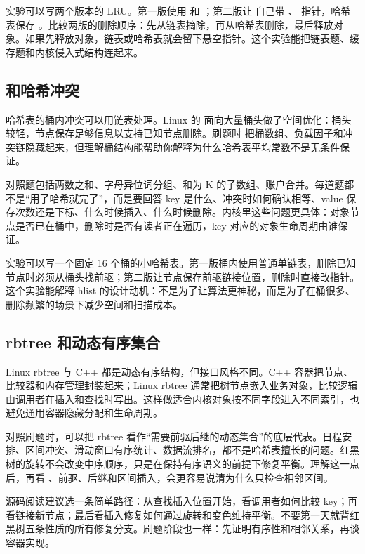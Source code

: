 实验可以写两个版本的 LRU。第一版使用  和 ；第二版让  自己带 、 指针，哈希表保存 。比较两版的删除顺序：先从链表摘除，再从哈希表删除，最后释放对象。如果先释放对象，链表或哈希表就会留下悬空指针。这个实验能把链表题、缓存题和内核侵入式结构连起来。

\subsection{ 和哈希冲突}

哈希表的桶内冲突可以用链表处理。Linux 的  面向大量桶头做了空间优化：桶头较轻，节点保存足够信息以支持已知节点删除。刷题时  把桶数组、负载因子和冲突链隐藏起来，但理解桶结构能帮助你解释为什么哈希表平均常数不是无条件保证。

对照题包括两数之和、字母异位词分组、和为 K 的子数组、账户合并。每道题都不是“用了哈希就完了”，而是要回答 key 是什么、冲突时如何确认相等、value 保存次数还是下标、什么时候插入、什么时候删除。内核里这些问题更具体：对象节点是否已在桶中，删除时是否有读者正在遍历，key 对应的对象生命周期由谁保证。

实验可以写一个固定 16 个桶的小哈希表。第一版桶内使用普通单链表，删除已知节点时必须从桶头找前驱；第二版让节点保存前驱链接位置，删除时直接改指针。这个实验能解释 hlist 的设计动机：不是为了让算法更神秘，而是为了在桶很多、删除频繁的场景下减少空间和扫描成本。

\subsection{rbtree 和动态有序集合}

Linux rbtree 与 C++  都是动态有序结构，但接口风格不同。C++ 容器把节点、比较器和内存管理封装起来；Linux rbtree 通常把树节点嵌入业务对象，比较逻辑由调用者在插入和查找时写出。这样做适合内核对象按不同字段进入不同索引，也避免通用容器隐藏分配和生命周期。

对照刷题时，可以把 rbtree 看作“需要前驱后继的动态集合”的底层代表。日程安排、区间冲突、滑动窗口有序统计、数据流排名，都不是哈希表擅长的问题。红黑树的旋转不会改变中序顺序，只是在保持有序语义的前提下修复平衡。理解这一点后，再看 、前驱、后继和区间插入，会更容易说清为什么只检查相邻区间。

源码阅读建议选一条简单路径：从查找插入位置开始，看调用者如何比较 key；再看链接新节点；最后看插入修复如何通过旋转和变色维持平衡。不要第一天就背红黑树五条性质的所有修复分支。刷题阶段也一样：先证明有序性和相邻关系，再谈容器实现。


